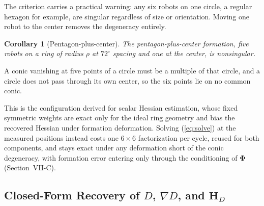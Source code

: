 \documentclass[lettersize,journal]{IEEEtran}
\newtheorem{corollary}{Corollary}
\begin{document}
The criterion carries a practical warning: any six robots on one circle,
a regular hexagon for example, are singular regardless of size or
orientation. Moving one robot to the center removes the degeneracy
entirely.

\begin{corollary}[Pentagon-plus-center]
\label{cor:pentagon}
The pentagon-plus-center formation, five robots on a ring of radius
$\rho$ at $72^\circ$ spacing and one at the center, is nonsingular.
\end{corollary}

\begin{IEEEproof}
A conic vanishing at five points of a circle must be a multiple of that
circle, and a circle does not pass through its own center, so the six
points lie on no common conic.
\end{IEEEproof}

This is the configuration \cite{15} derived for scalar Hessian
estimation, whose
fixed symmetric weights are exact only for the ideal ring geometry and
bias the recovered Hessian under formation deformation. Solving
(\ref{eq:solve}) at the measured positions instead costs one
$6 \times 6$ factorization per cycle, reused for
both components, and stays exact under any deformation short of the
conic degeneracy, with formation error entering only through the
conditioning of $\boldsymbol{\Phi}$ (Section~\mbox{VII-C}).

\subsection{Closed-Form Recovery of $D$, $\nabla D$, and $\mathbf{H}_D$}
\end{document}
